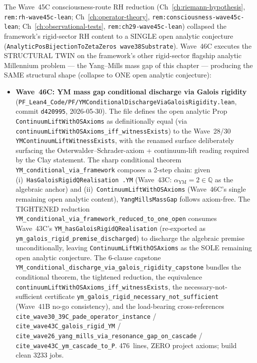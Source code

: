 \begin{remark}\label{rem:ym-wave46c-lean}
The Wave~45C consciousness-route RH reduction (Ch~\ref{ch:riemann-hypothesis}, \texttt{rem:rh-wave45c-lean}; Ch~\ref{ch:operator-theory}, \texttt{rem:consciousness-wave45c-lean}; Ch~\ref{ch:observational-tests}, \texttt{rem:ch29-wave45c-lean}) collapsed the framework's rigid-sector RH content to a SINGLE open analytic conjecture (\texttt{AnalyticPosBijectionToZetaZeros wave38Substrate}). Wave~46C executes the STRUCTURAL TWIN on the framework's other rigid-sector flagship analytic Millennium problem --- the Yang--Mills mass gap of this chapter --- producing the SAME structural shape (collapse to ONE open analytic conjecture):
\begin{itemize}
  \item \textbf{Wave~46C: YM mass gap conditional discharge via Galois rigidity} (\texttt{PF\_Lean4\_Code/PF/YMConditionalDischargeViaGaloisRigidity.lean}, commit \texttt{d420995}, 2026-05-30). The file defines the open analytic Prop \texttt{ContinuumLiftWithOSAxioms} as definitionally equal (via \texttt{continuumLiftWithOSAxioms\_iff\_witnessExists}) to the Wave~28/30 \texttt{YMContinuumLiftWitnessExists}, with the renamed surface deliberately surfacing the Osterwalder--Schrader-axiom + continuum-lift reading required by the Clay statement. The sharp conditional theorem \texttt{YM\_conditional\_via\_framework} composes a 2-step chain: given (i)~\texttt{HasGaloisRigidQRealisation .YM} (Wave~43C: $\alpha_{\mathrm{YM}} = 2 \in \mathbb{Q}$ as the algebraic anchor) and (ii)~\texttt{ContinuumLiftWithOSAxioms} (Wave~46C's single remaining open analytic content), \texttt{YangMillsMassGap} follows axiom-free. The TIGHTENED reduction \texttt{YM\_conditional\_via\_framework\_reduced\_to\_one\_open} consumes Wave~43C's \texttt{YM\_hasGaloisRigidQRealisation} (re-exported as \texttt{ym\_galois\_rigid\_premise\_discharged}) to discharge the algebraic premise unconditionally, leaving \texttt{ContinuumLiftWithOSAxioms} as the SOLE remaining open analytic conjecture. The 6-clause capstone \texttt{YM\_conditional\_discharge\_via\_galois\_rigidity\_capstone} bundles the conditional theorem, the tightened reduction, the equivalence \texttt{continuumLiftWithOSAxioms\_iff\_witnessExists}, the necessary-not-sufficient certificate \texttt{ym\_galois\_rigid\_necessary\_not\_sufficient} (Wave~41B no-go consistency), and the load-bearing cross-references \texttt{cite\_wave30\_39C\_pade\_operator\_instance} / \texttt{cite\_wave43C\_galois\_rigid\_YM} / \texttt{cite\_wave26\_yang\_mills\_via\_resonance\_gap\_on\_cascade} / \texttt{cite\_wave43C\_ym\_cascade\_to\_P}. 476~lines, ZERO project axioms; build clean 3233 jobs.

\end{itemize}
\end{remark}
